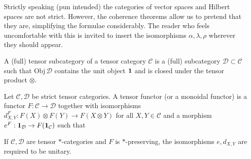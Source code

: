 \documentclass[12pt]{article}
\theoremstyle{definition}
\theoremstyle{definition}
\theoremstyle{remark}
\newcommand{\Obj}{\mathrm{Obj}}
\def\2#1{{\mathcal #1}}
\def\1#1{{\bf #1}}
\newcommand{\rarr}{\rightarrow}
\def\id{\mathrm{id}}
\begin{document}
Strictly speaking (pun intended) the categories of vector spaces and Hilbert spaces are not strict. 
However, the coherence theorems allow us to pretend that they are, simplifying the formulae
considerably. The reader who feels uncomfortable with this is invited to insert the isomorphisms
$\alpha,\lambda,\rho$ wherever they should appear.
\erem

\bdefin {} 
A (full) tensor subcategory of a tensor category $\2C$ is a (full) subcategory
$\2D\subset\2C$ such that $\Obj\,\2D$ contains the unit object $\11$ and is closed under the tensor
product $\otimes$.
\edefin

\bdefin \label{def-mon-func}  
Let $\2C, \2D$ be strict tensor categories. A tensor functor (or a monoidal functor) is a functor
$F: \2C\rarr\2D$ together with isomorphisms $d^F_{X,Y}: F(X)\otimes F(Y)\rarr F(X\otimes Y)$ for all
$X,Y\in\2C$ and a morphism $e^F: \11_\2D\rarr F(\11_\2C)$ such that
If $\2C,\2D$ are tensor $*$-categories and $F$ is $*$-preserving, the isomorphisms $e, d_{X,Y}$ are 
required to be unitary. 
\edefin
\end{document}
